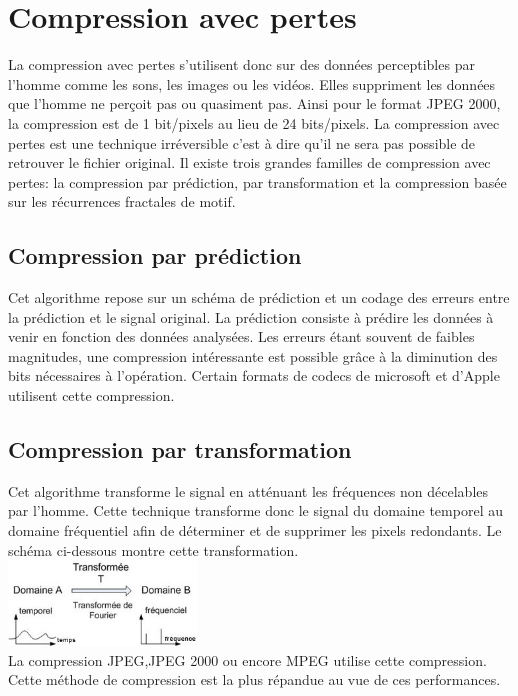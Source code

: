 \documentclass[a4paper]{report}
\begin{document}
	\section{Compression avec pertes}
		La compression avec pertes s'utilisent donc sur des données perceptibles par l'homme comme les sons, les images ou les vidéos. Elles suppriment les données que l'homme ne perçoit pas ou quasiment pas. Ainsi pour le format JPEG 2000, la compression est de 1 bit/pixels au lieu de 24 bits/pixels. La compression avec pertes est une technique irréversible c'est à dire qu'il ne sera pas possible de retrouver le fichier original. Il existe trois grandes familles de compression avec pertes: la compression par prédiction, par transformation et la compression basée sur les récurrences fractales de motif.
	\subsection{Compression par prédiction}
		Cet algorithme repose sur un schéma de prédiction et un codage des erreurs entre la prédiction et le signal original. La prédiction consiste à prédire les données à venir en fonction des données analysées. Les erreurs étant souvent de faibles magnitudes, une compression intéressante est possible grâce à la diminution des bits nécessaires à l’opération. Certain formats de codecs de microsoft et d'Apple utilisent cette compression.
	\subsection{Compression par transformation}
		Cet algorithme transforme le signal en atténuant les fréquences non décelables par l'homme. Cette technique transforme donc le signal du domaine temporel au domaine fréquentiel afin de déterminer et de supprimer les pixels redondants.  Le schéma ci-dessous montre cette transformation.\\
	\includegraphics[width=5cm]{img/transformation.jpg} \\
La compression JPEG,JPEG 2000 ou encore MPEG utilise cette compression. Cette méthode de compression est la plus répandue au vue de ces performances.
\end{document}
